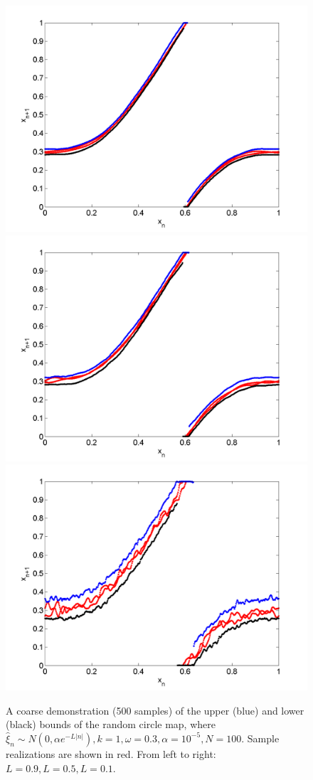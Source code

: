 \begin{figure}[htp]
\caption[Upper and lower bounds on the random circle map, with a normal
distribution, where $k=1,\omega=0.3$]{A coarse
  demonstration (500 samples) of the upper (blue) and lower (black)
  bounds of the random circle map, where $\hat{\xi}_n\sim N(0,\alpha
  e^{-L|n|}),k=1,\omega=0.3,\alpha = 10^{-5},N=100$. Sample
  realizations are shown in red. From left to right: $L=0.9,L=0.5,L=0.1$.}\label{fig:circ_n_envelope1}
\centering
\includegraphics[width=.3\textwidth]{figs/envelope_norm_500_k1_L09_w03.png}\hfill
\includegraphics[width=.3\textwidth]{figs/envelope_norm_500_k1_L05_w03.png}\hfill
\includegraphics[width=.3\textwidth]{figs/envelope_norm_500_k1_L01_w03.png}
\end{figure}
